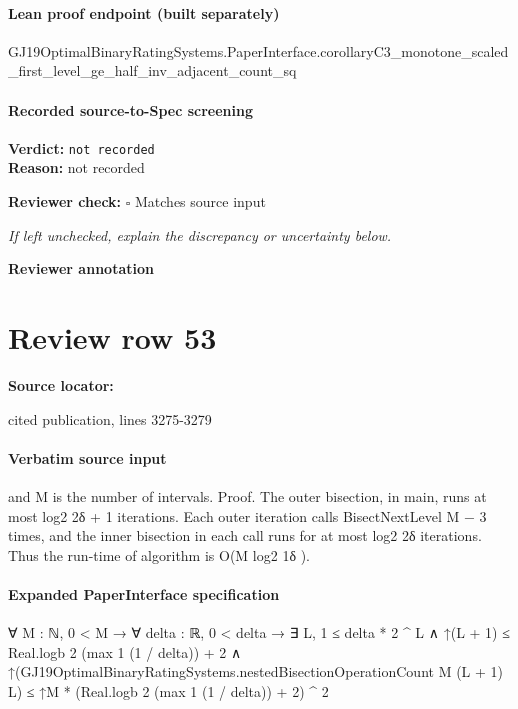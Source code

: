 \documentclass[10pt]{article}
\newcommand{\reviewerbox}{%
  \par\noindent\fbox{\parbox{0.96\linewidth}{\rule{0pt}{0.38in}}}\par
}
\newcommand{\reviewmatch}[1]{%
  \par\noindent\textbf{Reviewer check:} $\square$\; #1\par
  \noindent\emph{If left unchecked, explain the discrepancy or uncertainty below.}\par
}
\begin{document}
\paragraph{Lean proof endpoint (built separately)}\begin{ReviewVerbatim}
GJ19OptimalBinaryRatingSystems.PaperInterface.corollaryC3_monotone_scaled_first_level_ge_half_inv_adjacent_count_sq
\end{ReviewVerbatim}

\paragraph{Recorded source-to-Spec screening}
\textbf{Verdict:} \texttt{not recorded}
\\
\textbf{Reason:} not recorded
\reviewmatch{Matches source input}
\noindent\textbf{Reviewer annotation}\par
\reviewerbox
\clearpage
\hypertarget{source-claim-8cc85076f8ab0b2b}{}
\section*{Review row 53}
\textbf{Source locator:} {\footnotesize\raggedright cited publication, lines 3275-\allowbreak{}3279\par}
\paragraph{Verbatim source input}
\begin{ReviewVerbatim}
and M is the number of intervals.
Proof. The outer bisection, in main, runs at most log2 2δ + 1 iterations. Each outer iteration calls
BisectNextLevel M − 3 times, and the inner bisection in each call runs for at most log2 2δ iterations.
Thus the run-time of algorithm is O(M log2 1δ ).
\end{ReviewVerbatim}


\paragraph{Expanded PaperInterface specification}
\begin{ReviewVerbatim}
∀ {M : ℕ},
  0 < M →
    ∀ {delta : ℝ},
      0 < delta →
        ∃ L,
          1 ≤ delta * 2 ^ L ∧
            ↑(L + 1) ≤ Real.logb 2 (max 1 (1 / delta)) + 2 ∧
              ↑(GJ19OptimalBinaryRatingSystems.nestedBisectionOperationCount M (L + 1) L) ≤
                ↑M * (Real.logb 2 (max 1 (1 / delta)) + 2) ^ 2
\end{ReviewVerbatim}
\end{document}
